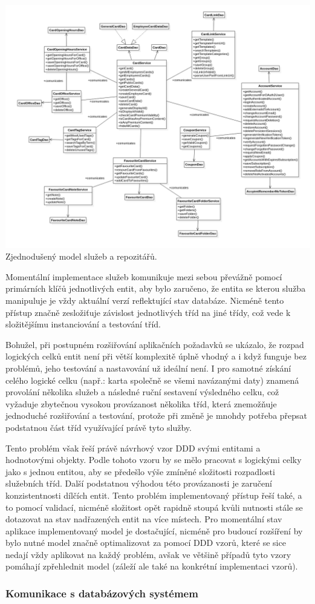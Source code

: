 		\includegraphics[width=0.24\linewidth]{obrazky/sluzby_a_repozitare}\hfill
		Zjednodušený model služeb a repozitářů. %

		Momentální implementace služeb komunikuje mezi sebou převážně pomocí primárních klíčů jednotlivých entit, aby
		bylo zaručeno, že entita se kterou služba manipuluje je vždy aktuální verzí reflektující stav databáze.
		Nicméně tento přístup značně zesložiťuje závislost jednotlivých tříd na jiné třídy, což vede k složitějšímu
		instanciování a testování tříd.

		Bohužel, při postupném rozšiřování aplikačních požadavků se ukázalo, že rozpad logických celků entit není při větší
		komplexitě úplně vhodný a i když funguje bez problémů, jeho testování a nastavování už ideální není.
		I pro samotné získání celého logické celku (např.: karta společně se všemi navázanými daty) znamená provolání
		několika služeb a následné ruční sestavení výsledného celku, což vyžaduje zbytečnou vysokou provázanost několika tříd,
		která znemožňuje jednoduché rozšiřování a testování, protože při změně je mnohdy potřeba přepsat podstatnou část
		tříd využívající právě tyto služby.

		Tento problém však řeší právě návrhový vzor \ac{DDD} svými entitami a hodnotovými objekty.
		Podle tohoto vzoru by se mělo pracovat s logickými celky jako s jednou entitou, aby se předešlo výše zmíněné složitosti
		rozpadlosti služebních tříd.
		Další podstatnou výhodou této provázanosti je zaručení konzistentnosti dílčích entit.
		Tento problém implementovaný přístup řeší také, a to pomocí validací, nicméně složitost opět rapidně stoupá kvůli
		nutnosti stále se dotazovat na stav nadřazených entit na více místech.
		\cite{ddd_quickly}
		Pro momentální stav aplikace implementovaný model je dostačující, nicméně pro budoucí rozšíření by bylo nutné
		model značně optimalizovat za pomocí \ac{DDD} vzorů, které se sice nedají vždy aplikovat na každý problém, avšak
		ve většině případů tyto vzory pomáhají zpřehlednit model (záleží ale také na konkrétní implementaci vzorů).


		\subsubsection{Komunikace s databázových systémem}

